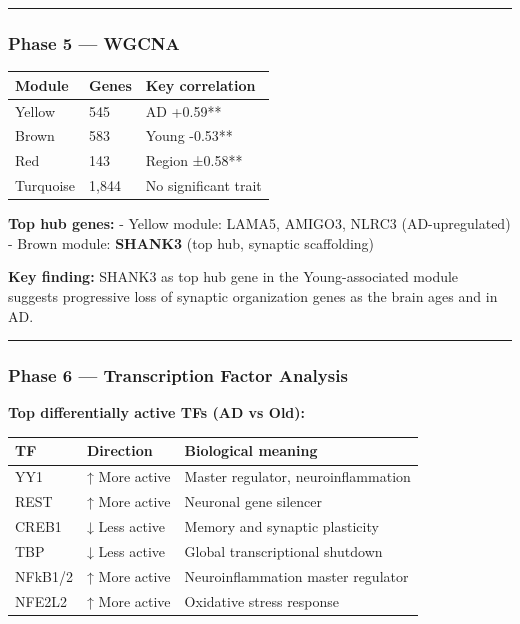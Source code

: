 \documentclass[
]{article}
\begin{document}
\begin{center}\rule{0.5\linewidth}{0.5pt}\end{center}

\subsubsection{Phase 5 --- WGCNA}\label{phase-5-wgcna}

\begin{longtable}[]{@{}lll@{}}
\toprule\noalign{}
Module & Genes & Key correlation \\
\midrule\noalign{}
\endhead
\bottomrule\noalign{}
\endlastfoot
Yellow & 545 & AD +0.59** \\
Brown & 583 & Young -0.53** \\
Red & 143 & Region ±0.58** \\
Turquoise & 1,844 & No significant trait \\
\end{longtable}

\textbf{Top hub genes:} - Yellow module: LAMA5, AMIGO3, NLRC3
(AD-upregulated) - Brown module: \textbf{SHANK3} (top hub, synaptic
scaffolding)

\textbf{Key finding:} SHANK3 as top hub gene in the Young-associated
module suggests progressive loss of synaptic organization genes as the
brain ages and in AD.

\begin{center}\rule{0.5\linewidth}{0.5pt}\end{center}

\subsubsection{Phase 6 --- Transcription Factor
Analysis}\label{phase-6-transcription-factor-analysis}

\textbf{Top differentially active TFs (AD vs Old):}

\begin{longtable}[]{@{}lll@{}}
\toprule\noalign{}
TF & Direction & Biological meaning \\
\midrule\noalign{}
\endhead
\bottomrule\noalign{}
\endlastfoot
YY1 & ↑ More active & Master regulator, neuroinflammation \\
REST & ↑ More active & Neuronal gene silencer \\
CREB1 & ↓ Less active & Memory and synaptic plasticity \\
TBP & ↓ Less active & Global transcriptional shutdown \\
NFkB1/2 & ↑ More active & Neuroinflammation master regulator \\
NFE2L2 & ↑ More active & Oxidative stress response \\
\end{longtable}
\end{document}
